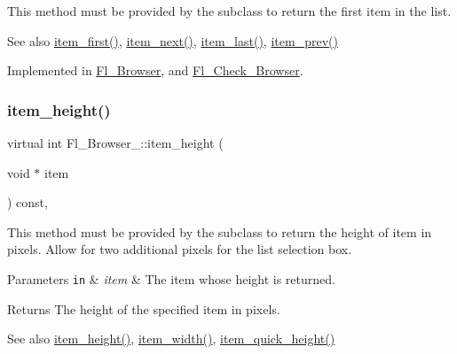 This method must be provided by the subclass to return the first item in the list. \begin{DoxySeeAlso}{See also}
\hyperlink{class_fl___browser___a43dd6231f2684f132a5a33b5d7d0c8e7}{item\+\_\+first()}, \hyperlink{class_fl___browser___aca6035552f5e9ecbeaa6caaf5fb8a3cb}{item\+\_\+next()}, \hyperlink{class_fl___browser___a2302bec54f4ea593146be5490a7fe93b}{item\+\_\+last()}, \hyperlink{class_fl___browser___afeb24ca0dbd8e4685fa18382512c94d3}{item\+\_\+prev()} 
\end{DoxySeeAlso}


Implemented in \hyperlink{class_fl___browser_a7822c6d04744af8f9ffa7a1e0c46955c}{Fl\+\_\+\+Browser}, and \hyperlink{class_fl___check___browser_a7b7acdf6eff04f97bae4f0cb505b8866}{Fl\+\_\+\+Check\+\_\+\+Browser}.

\mbox{\label{class_fl___browser___a5487d8f8d3e9cce3e87918f8f53e6ae6}} 
\subsubsection{\texorpdfstring{item\+\_\+height()}{item\_height()}}
{\footnotesize\ttfamily virtual int Fl\+\_\+\+Browser\+\_\+\+::item\+\_\+height (\begin{DoxyParamCaption}\item[{void $\ast$}]{item }\end{DoxyParamCaption}) const\hspace{0.3cm}{\ttfamily [protected]}, {}}

This method must be provided by the subclass to return the height of {\ttfamily item} in pixels. Allow for two additional pixels for the list selection box. 
\begin{DoxyParams}[1]{Parameters}
\mbox{\tt in}  & {\em item} & The item whose height is returned. \\
\hline
\end{DoxyParams}
\begin{DoxyReturn}{Returns}
The height of the specified {\ttfamily item} in pixels. 
\end{DoxyReturn}
\begin{DoxySeeAlso}{See also}
\hyperlink{class_fl___browser___a5487d8f8d3e9cce3e87918f8f53e6ae6}{item\+\_\+height()}, \hyperlink{class_fl___browser___a3b84b5418ac2554dfaaeb50cfba63569}{item\+\_\+width()}, \hyperlink{class_fl___browser___aa9f378038994076e866daac8ca050507}{item\+\_\+quick\+\_\+height()} 
\end{DoxySeeAlso}


